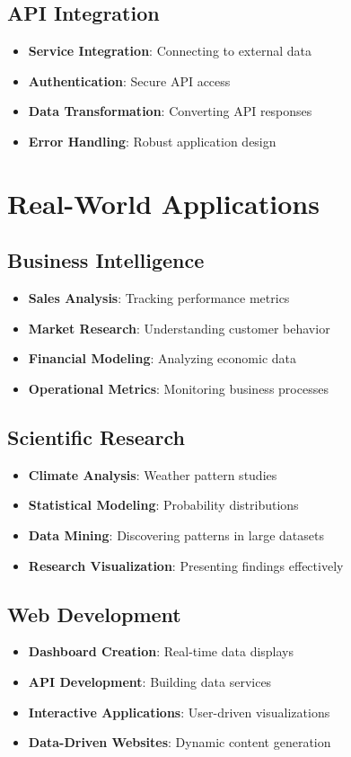 \subsection*{API Integration}
\begin{itemize}
    \item \textbf{Service Integration}: Connecting to external data
    \item \textbf{Authentication}: Secure API access
    \item \textbf{Data Transformation}: Converting API responses
    \item \textbf{Error Handling}: Robust application design
\end{itemize}

\section*{Real-World Applications}

\subsection*{Business Intelligence}
\begin{itemize}
    \item \textbf{Sales Analysis}: Tracking performance metrics
    \item \textbf{Market Research}: Understanding customer behavior
    \item \textbf{Financial Modeling}: Analyzing economic data
    \item \textbf{Operational Metrics}: Monitoring business processes
\end{itemize}

\subsection*{Scientific Research}
\begin{itemize}
    \item \textbf{Climate Analysis}: Weather pattern studies
    \item \textbf{Statistical Modeling}: Probability distributions
    \item \textbf{Data Mining}: Discovering patterns in large datasets
    \item \textbf{Research Visualization}: Presenting findings effectively
\end{itemize}

\subsection*{Web Development}
\begin{itemize}
    \item \textbf{Dashboard Creation}: Real-time data displays
    \item \textbf{API Development}: Building data services
    \item \textbf{Interactive Applications}: User-driven visualizations
    \item \textbf{Data-Driven Websites}: Dynamic content generation
\end{itemize}

